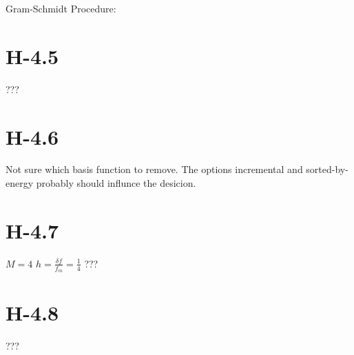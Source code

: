 \documentclass{article}
\begin{document}
Gram-Schmidt Procedure:

\section{H-4.5}

???

\section{H-4.6}

Not sure which basis function to remove.
The options incremental and sorted-by-energy probably should influnce the desicion.

\section{H-4.7}
$M=4$
$h = \frac{\delta f}{f_m} = \frac{1}{4}$ ???

\section{H-4.8}

???
\end{document}
